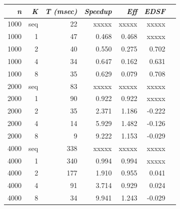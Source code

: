 \documentclass{dependencies/acm_proc_article-sp}
\begin{document}
\begin{center}
\begin{tabular}{|r|r|r|r|r|r|r|}\hline
{\em n} & {\em K} & {\em T (msec)} & {\em Speedup} & {\em Eff} & {\em EDSF} \\\hline
1000    & seq     &  22        & xxxxx       & xxxxx   & xxxxx     \\\hline
1000    & 1       &  47        & 0.468       & 0.468   & xxxxx     \\\hline
1000    & 2       &  40        & 0.550       & 0.275   & 0.702     \\\hline
1000    & 4       &  34        & 0.647       & 0.162   & 0.631     \\\hline
1000    & 8       &  35        & 0.629       & 0.079   & 0.708     \\\hline
2000    & seq     &  83        & xxxxx       & xxxxx   & xxxxx     \\\hline
2000    & 1       &  90        & 0.922       & 0.922   & xxxxx     \\\hline
2000    & 2       &  35        & 2.371       & 1.186   & -0.222    \\\hline
2000    & 4       &  14        & 5.929       & 1.482   & -0.126    \\\hline
2000    & 8       &   9        & 9.222       & 1.153   & -0.029    \\\hline
4000    & seq     &  338       & xxxxx       & xxxxx   & xxxxx     \\\hline
4000    & 1       &  340       & 0.994       & 0.994   & xxxxx     \\\hline
4000    & 2       &  177       & 1.910       & 0.955   & 0.041     \\\hline
4000    & 4       &  91        & 3.714       & 0.929   & 0.024     \\\hline
4000    & 8       &  34        & 9.941       & 1.243   & -0.029    \\\hline
\end{tabular}
\end{center}
\end{document}
